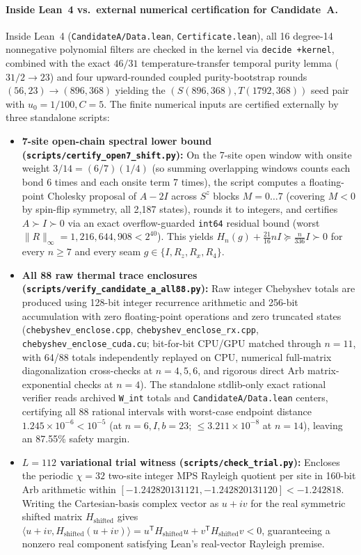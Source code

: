 \documentclass[11pt,a4paper]{article}
\newcommand{\id}[1]{{\small\nolinkurl{#1}}}
\begin{document}
\paragraph{Inside Lean~4 vs.\ external numerical certification for Candidate~A.}
Inside Lean~4 (\id{CandidateA/Data.lean}, \id{Certificate.lean}), all 16 degree-14 nonnegative polynomial filters are checked in the kernel via \id{decide +kernel}, combined with the exact $46/31$ temperature-transfer temporal purity lemma ($31/2 \to 23$) and four upward-rounded coupled purity-bootstrap rounds $(56, 23) \to (896, 368)$ yielding the $(S(896, 368), T(1792, 368))$ seed pair with $u_0 = 1/100, C = 5$.
The finite numerical inputs are certified externally by three standalone scripts:
\begin{itemize}[leftmargin=1.6em,itemsep=2pt]
  \item \textbf{7-site open-chain spectral lower bound (\id{scripts/certify_open7_shift.py}):} On the 7-site open window with onsite weight $3/14 = (6/7)(1/4)$ (so summing overlapping windows counts each bond 6 times and each onsite term 7 times), the script computes a floating-point Cholesky proposal of $A - 2I$ across $S^z$ blocks $M = 0\ldots 7$ (covering $M < 0$ by spin-flip symmetry, all 2{,}187 states), rounds it to integers, and certifies $A \succ I \succ 0$ via an exact overflow-guarded \id{int64} residual bound (worst $\|R\|_\infty = 1{,}216{,}644{,}908 < 2^{40}$). This yields $H_n(g) + \frac{21}{16}n I \succeq \frac{n}{336}I \succ 0$ for every $n \ge 7$ and every seam $g \in \{I, R_z, R_x, R_4\}$.
  \item \textbf{All 88 raw thermal trace enclosures (\id{scripts/verify_candidate_a_all88.py}):} Raw integer Chebyshev totals are produced using 128-bit integer recurrence arithmetic and 256-bit accumulation with zero floating-point operations and zero truncated states (\id{chebyshev_enclose.cpp}, \id{chebyshev_enclose_rx.cpp}, \id{chebyshev_enclose_cuda.cu}; bit-for-bit CPU/GPU matched through $n = 11$, with 64/88 totals independently replayed on CPU, numerical full-matrix diagonalization cross-checks at $n = 4, 5, 6$, and rigorous direct Arb matrix-exponential checks at $n = 4$). The standalone stdlib-only exact rational verifier reads archived \id{W_int} totals and \id{CandidateA/Data.lean} centers, certifying all 88 rational intervals with worst-case endpoint distance $1.245 \times 10^{-6} < 10^{-5}$ (at $n = 6, I, b = 23$; $\le 3.211 \times 10^{-8}$ at $n = 14$), leaving an 87.55\% safety margin.
  \item \textbf{$L = 112$ variational trial witness (\id{scripts/check_trial.py}):} Encloses the periodic $\chi = 32$ two-site integer MPS Rayleigh quotient per site in 160-bit Arb arithmetic within $[-1.242820131121, -1.242820131120] < -1.242818$. Writing the Cartesian-basis complex vector as $u + i v$ for the real symmetric shifted matrix $H_{\mathrm{shifted}}$ gives $\langle u+iv, H_{\mathrm{shifted}}(u+iv)\rangle = u^\mathsf{T} H_{\mathrm{shifted}} u + v^\mathsf{T} H_{\mathrm{shifted}} v < 0$, guaranteeing a nonzero real component satisfying Lean's real-vector Rayleigh premise.
\end{itemize}
\end{document}
